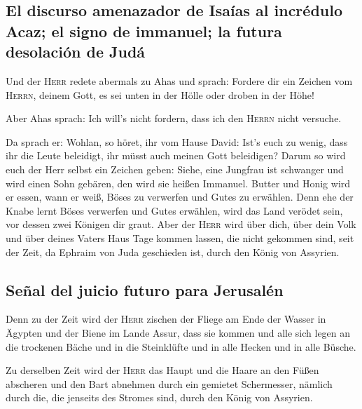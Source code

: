 \hypertarget{el-discurso-amenazador-de-isauxedas-al-incruxe9dulo-acaz-el-signo-de-immanuel-la-futura-desolaciuxf3n-de-juduxe1}{%
\subsection{El discurso amenazador de Isaías al incrédulo Acaz; el signo
de immanuel; la futura desolación de
Judá}\label{el-discurso-amenazador-de-isauxedas-al-incruxe9dulo-acaz-el-signo-de-immanuel-la-futura-desolaciuxf3n-de-juduxe1}}

 Und der \textsc{Herr} redete abermals zu Ahas und
sprach:  Fordere dir ein Zeichen vom \textsc{Herrn},
deinem Gott, es sei unten in der Hölle oder droben in der Höhe!

 Aber Ahas sprach: Ich will's nicht fordern, dass ich den
\textsc{Herrn} nicht versuche.

 Da sprach er: Wohlan, so höret, ihr vom Hause David:
Ist's euch zu wenig, dass ihr die Leute beleidigt, ihr müsst auch meinen
Gott beleidigen?  Darum so wird euch der Herr selbst ein
Zeichen geben: Siehe, eine Jungfrau ist schwanger und wird einen Sohn
gebären, den wird sie heißen Immanuel.  Butter und Honig
wird er essen, wann er weiß, Böses zu verwerfen und Gutes zu erwählen.
 Denn ehe der Knabe lernt Böses verwerfen und Gutes
erwählen, wird das Land verödet sein, vor dessen zwei Königen dir graut.
 Aber der \textsc{Herr} wird über dich, über dein Volk
und über deines Vaters Haus Tage kommen lassen, die nicht gekommen sind,
seit der Zeit, da Ephraim von Juda geschieden ist, durch den König von
Assyrien.

\hypertarget{seuxf1al-del-juicio-futuro-para-jerusaluxe9n}{%
\subsection{Señal del juicio futuro para
Jerusalén}\label{seuxf1al-del-juicio-futuro-para-jerusaluxe9n}}

 Denn zu der Zeit wird der \textsc{Herr} zischen der
Fliege am Ende der Wasser in Ägypten und der Biene im Lande Assur,
 dass sie kommen und alle sich legen an die trockenen
Bäche und in die Steinklüfte und in alle Hecken und in alle Büsche.

 Zu derselben Zeit wird der \textsc{Herr} das Haupt und
die Haare an den Füßen abscheren und den Bart abnehmen durch ein
gemietet Schermesser, nämlich durch die, die jenseits des Stromes sind,
durch den König von Assyrien.

